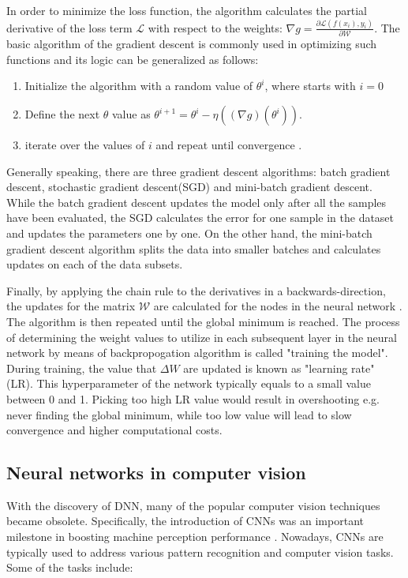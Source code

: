 \documentclass[english, 12pt, a4paper, elec, utf8, a-1b, online]{aaltothesis}
\begin{document}
In order to minimize the loss function, the algorithm calculates the partial derivative of the loss term $\mathcal{L}$ with respect to the weights: $\nabla g = \frac{\partial \mathcal{L}(f(x_i), y_i)}{\partial \mathcal{W}}$. The basic algorithm of the gradient descent is commonly used in optimizing such functions and its logic can be generalized as follows: 

\begin{enumerate}
  \item Initialize the algorithm with a random value of $\theta^{i}$, where starts with $i=0$ 
  \item Define the next $\theta$ value as $\theta^{i+1} = \theta^{i}-\eta\left((\nabla g)\left(\theta^{i}\right)\right)$.
  \item iterate over the values of $i$ and repeat until convergence \cite{Albarghouthi2021}.
\end{enumerate} 

Generally speaking, there are three gradient descent algorithms: batch gradient descent, stochastic gradient descent(SGD) and mini-batch gradient descent. While the batch gradient descent updates the model only after all the samples have been evaluated, the SGD calculates the error for one sample in the dataset and updates the parameters one by one. On the other hand, the mini-batch gradient descent algorithm splits the data into smaller batches and calculates updates on each of the data subsets. 

Finally, by applying the chain rule to the derivatives in a backwards-direction, the updates for the matrix $\mathcal{W}$ are calculated for the nodes in the neural network \cite{Alber2018}. The algorithm is then repeated until the global minimum is reached. The process of determining the weight values to utilize in each subsequent layer in the neural network by means of backpropogation algorithm is called "training the model". During training, the value that $\Delta W$ are updated is known as "learning rate" (LR). This hyperparameter of the network typically equals to a small value between 0 and 1. Picking too high LR value would result in overshooting e.g. never finding the global minimum, while too low value will lead to slow convergence and higher computational costs. 


\subsection{Neural networks in computer vision}
\label{neural_nets} 
With the discovery of DNN, many of the popular computer vision techniques became obsolete. Specifically, the introduction of CNNs was an important milestone in boosting machine perception performance \cite{Mahony2019}. Nowadays, CNNs are typically used to address various pattern recognition and computer vision tasks. Some of the tasks  include:
\end{document}
